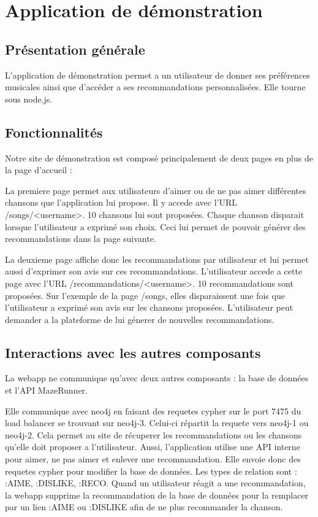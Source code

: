 \section{Application de démonstration}

\subsection{Présentation générale}

L'application de démonstration permet a un utilisateur de donner ses préférences musicales ainsi que d'accéder a ses recommandations personnalisées.
Elle tourne sous node.js.
\subsection{Fonctionnalités}

Notre site de démonstration est composé principalement de deux pages en plus de la page d'accueil :

La premiere page permet aux utilisateurs d'aimer ou de ne pas aimer différentes chansons que l'application lui propose. Il y accede avec l'URL /songs/<username>.
10 chansons lui sont proposées. Chaque chanson disparait lorsque l'utilisateur a exprimé son choix. Ceci lui permet de pouvoir générer des recommandations dans la page suivante.

La deuxieme page affiche donc les recommandations par utilisateur et lui permet aussi d'exprimer son avis sur ces recommandations. L'utilisateur accede a cette page avec l'URL /recommandations/<username>.
10 recommandations sont proposées. Sur l'exemple de la page /songs, elles disparaissent une fois que l'utilisateur a exprimé son avis sur les chansons proposées. L'utilisateur peut demander a la plateforme de lui génerer de nouvelles recommandations.

\subsection{Interactions avec les autres composants}

La webapp ne communique qu'avec deux autres composants : la base de données et l'API MazeRunner.

Elle communique avec neo4j en faisant des requetes cypher sur le port 7475 du load balancer se trouvant sur neo4j-3. Celui-ci répartit la requete vers neo4j-1 ou neo4j-2. Cela permet au site de récuperer les recommandations ou les chansons qu'elle doit proposer a l'utilisateur.
Aussi, l'application utilise une API interne pour aimer, ne pas aimer et enlever une recommandation. Elle envoie donc des requetes cypher pour modifier la base de données. Les types de relation sont : :AIME, :DISLIKE, :RECO.
Quand un utilisateur réagit a une recommandation, la webapp supprime la recommandation de la base de données pour la remplacer par un lien :AIME ou :DISLIKE afin de ne plus recommander la chanson.

